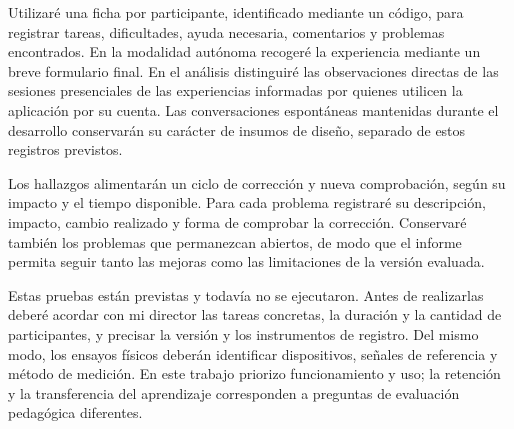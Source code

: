 Utilizaré una ficha por participante, identificado mediante un código, para
registrar tareas, dificultades, ayuda necesaria, comentarios y problemas
encontrados. En la modalidad autónoma recogeré la experiencia mediante un breve
formulario final. En el análisis distinguiré las observaciones directas de las
sesiones presenciales de las experiencias informadas por quienes utilicen la
aplicación por su cuenta. Las conversaciones espontáneas mantenidas durante
el desarrollo conservarán su carácter de insumos de diseño, separado de estos
registros previstos.

Los hallazgos alimentarán un ciclo de corrección y nueva comprobación, según
su impacto y el tiempo disponible. Para cada problema registraré su descripción,
impacto, cambio realizado y forma de comprobar la corrección. Conservaré también
los problemas que permanezcan abiertos, de modo que el informe permita seguir
tanto las mejoras como las limitaciones de la versión evaluada.

Estas pruebas están previstas y todavía no se ejecutaron. Antes de realizarlas
deberé acordar con mi director las tareas concretas, la duración y la cantidad
de participantes, y precisar la versión y los instrumentos de registro. Del mismo
modo, los ensayos físicos deberán identificar dispositivos, señales de referencia
y método de medición. En este trabajo priorizo funcionamiento y uso; la retención
y la transferencia del aprendizaje corresponden a preguntas de evaluación
pedagógica diferentes.
